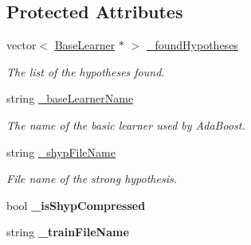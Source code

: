 \subsection*{Protected Attributes}
\begin{DoxyCompactItemize}
\item 
\hypertarget{classMultiBoost_1_1AdaBoostMHLearner_a723596e1dcce33d594e1d9cb90c2e85f}{vector$<$ \hyperlink{classMultiBoost_1_1BaseLearner}{Base\-Learner} $\ast$ $>$ \hyperlink{classMultiBoost_1_1AdaBoostMHLearner_a723596e1dcce33d594e1d9cb90c2e85f}{\-\_\-found\-Hypotheses}}\label{classMultiBoost_1_1AdaBoostMHLearner_a723596e1dcce33d594e1d9cb90c2e85f}

\begin{DoxyCompactList}\small\item\em The list of the hypotheses found. \end{DoxyCompactList}\item 
\hypertarget{classMultiBoost_1_1AdaBoostMHLearner_adc925d29e89aec971adfe091307f36a7}{string \hyperlink{classMultiBoost_1_1AdaBoostMHLearner_adc925d29e89aec971adfe091307f36a7}{\-\_\-base\-Learner\-Name}}\label{classMultiBoost_1_1AdaBoostMHLearner_adc925d29e89aec971adfe091307f36a7}

\begin{DoxyCompactList}\small\item\em The name of the basic learner used by Ada\-Boost. \end{DoxyCompactList}\item 
\hypertarget{classMultiBoost_1_1AdaBoostMHLearner_aa6cefa59149ee78ab97cc159413c845f}{string \hyperlink{classMultiBoost_1_1AdaBoostMHLearner_aa6cefa59149ee78ab97cc159413c845f}{\-\_\-shyp\-File\-Name}}\label{classMultiBoost_1_1AdaBoostMHLearner_aa6cefa59149ee78ab97cc159413c845f}

\begin{DoxyCompactList}\small\item\em File name of the strong hypothesis. \end{DoxyCompactList}\item 
\hypertarget{classMultiBoost_1_1AdaBoostMHLearner_ade7af135ce1f11882e4ad2aae172121d}{bool {\bfseries \-\_\-is\-Shyp\-Compressed}}\label{classMultiBoost_1_1AdaBoostMHLearner_ade7af135ce1f11882e4ad2aae172121d}

\item 
\hypertarget{classMultiBoost_1_1AdaBoostMHLearner_a4e27fd8b14c4bfc9e2359b58b592aa16}{string {\bfseries \-\_\-train\-File\-Name}}\label{classMultiBoost_1_1AdaBoostMHLearner_a4e27fd8b14c4bfc9e2359b58b592aa16}


\end{DoxyCompactItemize}
